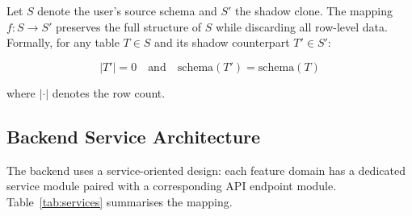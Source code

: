 \documentclass[12pt,a4paper]{report}
\begin{document}
Let $S$ denote the user's source schema and $S'$ the shadow clone. The mapping $f: S \rightarrow S'$ preserves the full structure of $S$ while discarding all row-level data. Formally, for any table $T \in S$ and its shadow counterpart $T' \in S'$:

\begin{equation}
    |T'| = 0 \quad \text{and} \quad \text{schema}(T') = \text{schema}(T)
\end{equation}

where $|\cdot|$ denotes the row count.

\subsection{Backend Service Architecture}

The backend uses a service-oriented design: each feature domain has a dedicated service module paired with a corresponding API endpoint module. Table~\ref{tab:services} summarises the mapping.
\end{document}

